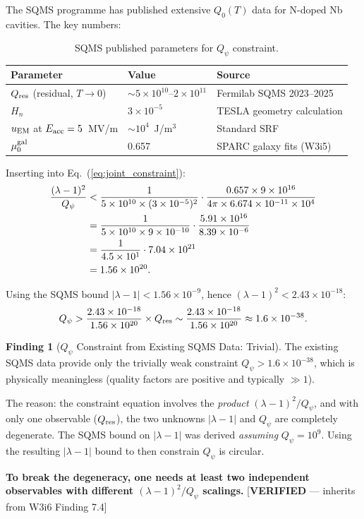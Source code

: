 \documentclass[11pt]{article}
\newcommand{\lam}{\lambda}
\newcommand{\ee}[1]{\times 10^{#1}}
\newcommand{\Qpsi}{Q_\psi}
\newcommand{\Heff}{H_n}
\newcommand{\muG}{\mu_0^{\rm gal}}
\newcommand{\lbone}{|\lam - 1|}
\theoremstyle{definition}
\newtheorem{finding}[theorem]{Finding}
\theoremstyle{remark}
\begin{document}
The SQMS programme has published extensive $Q_0(T)$ data for N-doped
Nb cavities. The key numbers:

\begin{table}[H]
\centering
\caption{SQMS published parameters for $\Qpsi$ constraint.}
\label{tab:sqms_params}
\renewcommand{\arraystretch}{1.2}
\begin{tabular}{@{}lll@{}}
\toprule
\textbf{Parameter} & \textbf{Value} & \textbf{Source} \\
\midrule
$Q_{\rm res}$ (residual, $T \to 0$) & $\sim 5\ee{10}$--$2\ee{11}$
  & Fermilab SQMS 2023--2025 \\
$\Heff$ & $3\ee{-5}$ & TESLA geometry calculation \\
$u_{\rm EM}$ at $E_{\rm acc} = 5$~MV/m & $\sim 10^4$~J/m$^3$ &
  Standard SRF \\
$\muG$ & 0.657 & SPARC galaxy fits (W3i5) \\
\bottomrule
\end{tabular}
\end{table}

Inserting into Eq.~(\ref{eq:joint_constraint}):
\begin{align}
\frac{(\lam-1)^2}{\Qpsi}
&< \frac{1}{5\ee{10}\times (3\ee{-5})^2}
\cdot\frac{0.657\times 9\ee{16}}{4\pi\times 6.674\ee{-11}\times 10^4}
\notag\\
&= \frac{1}{5\ee{10}\times 9\ee{-10}}
\cdot\frac{5.91\ee{16}}{8.39\ee{-6}}
\notag\\
&= \frac{1}{4.5\ee{1}}
\cdot 7.04\ee{21}
\notag\\
&= 1.56\ee{20}.
\label{eq:joint_numerical}
\end{align}

Using the SQMS bound $\lbone < 1.56\ee{-9}$, hence
$(\lam-1)^2 < 2.43\ee{-18}$:
\begin{equation}
\Qpsi > \frac{2.43\ee{-18}}{1.56\ee{20}} \times Q_{\rm res}
\sim \frac{2.43\ee{-18}}{1.56\ee{20}} \approx 1.6\ee{-38}.
\end{equation}

\begin{finding}[$\Qpsi$ Constraint from Existing SQMS Data: Trivial]
\label{find:Qpsi_trivial}
The existing SQMS data provide only the trivially weak constraint
$\Qpsi > 1.6\ee{-38}$, which is physically meaningless (quality
factors are positive and typically $\gg 1$).

The reason: the constraint equation involves the \emph{product}
$(\lam-1)^2/\Qpsi$, and with only one observable ($Q_{\rm res}$),
the two unknowns $\lbone$ and $\Qpsi$ are completely degenerate.
The SQMS bound on $\lbone$ was derived \emph{assuming}
$\Qpsi = 10^9$. Using the resulting $\lbone$ bound to then
constrain $\Qpsi$ is circular.

\textbf{To break the degeneracy, one needs at least two independent
observables with different $(\lam-1)^2/\Qpsi$ scalings.}
[\textbf{VERIFIED} --- inherits from W3i6 Finding 7.4]
\end{finding}
\end{document}
